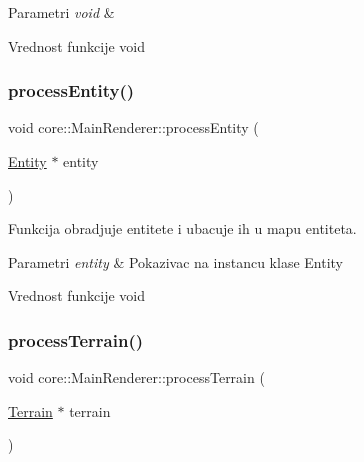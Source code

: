 \begin{DoxyParams}{Parametri}
{\em void} & \\
\hline
\end{DoxyParams}
\begin{DoxyReturn}{Vrednost funkcije}
void 
\end{DoxyReturn}
\mbox{\label{classcore_1_1MainRenderer_ae5ffaef40e727ab758d7b2d36ed4e92a}} 
\subsubsection{\texorpdfstring{process\+Entity()}{processEntity()}}
{\footnotesize\ttfamily void core\+::\+Main\+Renderer\+::process\+Entity (\begin{DoxyParamCaption}\item[{\hyperlink{classentity_1_1Entity}{Entity} $\ast$}]{entity }\end{DoxyParamCaption})}



Funkcija obradjuje entitete i ubacuje ih u mapu entiteta. 


\begin{DoxyParams}{Parametri}
{\em entity} & Pokazivac na instancu klase Entity \\
\hline
\end{DoxyParams}
\begin{DoxyReturn}{Vrednost funkcije}
void 
\end{DoxyReturn}
\mbox{\label{classcore_1_1MainRenderer_a4e8a3e6729a7d948761d6e74c48a6236}} 
\subsubsection{\texorpdfstring{process\+Terrain()}{processTerrain()}}
{\footnotesize\ttfamily void core\+::\+Main\+Renderer\+::process\+Terrain (\begin{DoxyParamCaption}\item[{\hyperlink{classterrain_1_1Terrain}{Terrain} $\ast$}]{terrain }\end{DoxyParamCaption})}



